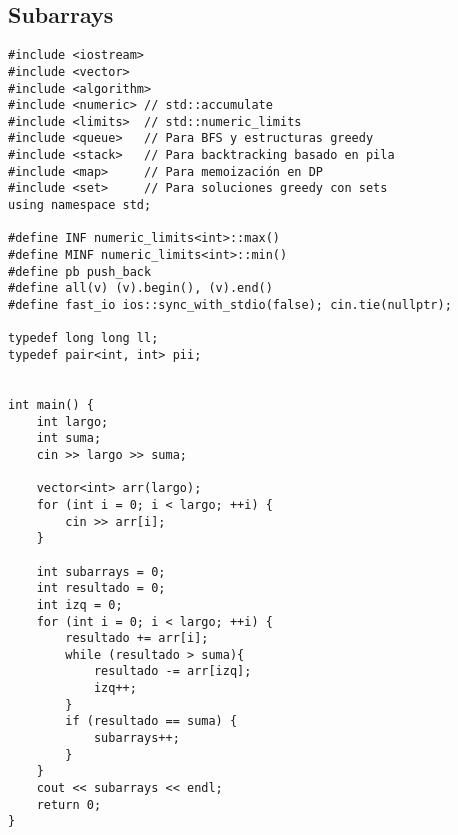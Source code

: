 \subsection{Subarrays}
\begin{lstlisting}[style=cpp]
#include <iostream>
#include <vector>
#include <algorithm>
#include <numeric> // std::accumulate
#include <limits>  // std::numeric_limits
#include <queue>   // Para BFS y estructuras greedy
#include <stack>   // Para backtracking basado en pila
#include <map>     // Para memoización en DP
#include <set>     // Para soluciones greedy con sets
using namespace std;

#define INF numeric_limits<int>::max()
#define MINF numeric_limits<int>::min()
#define pb push_back
#define all(v) (v).begin(), (v).end()
#define fast_io ios::sync_with_stdio(false); cin.tie(nullptr);

typedef long long ll;
typedef pair<int, int> pii;


int main() {
    int largo;
    int suma;
    cin >> largo >> suma;

    vector<int> arr(largo);
    for (int i = 0; i < largo; ++i) {
        cin >> arr[i];
    }

    int subarrays = 0;
    int resultado = 0;
    int izq = 0;
    for (int i = 0; i < largo; ++i) {
        resultado += arr[i];
        while (resultado > suma){
            resultado -= arr[izq];
            izq++;
        }
        if (resultado == suma) {
            subarrays++;
        }
    }
    cout << subarrays << endl;
    return 0;
}
\end{lstlisting}
